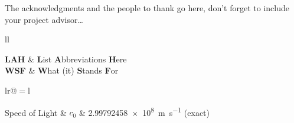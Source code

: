 \documentclass[
11pt, %
english, %
singlespacing, %
headsepline, %
]{MastersDoctoralThesis} %
\begin{document}
\begin{acknowledgements}
\addchaptertocentry{\acknowledgementname} %
The acknowledgments and the people to thank go here, don't forget to include your project advisor\ldots
\end{acknowledgements}


\tableofcontents %

\listoffigures %

\listoftables %


\begin{abbreviations}{ll} %

\textbf{LAH} & \textbf{L}ist \textbf{A}bbreviations \textbf{H}ere\\
\textbf{WSF} & \textbf{W}hat (it) \textbf{S}tands \textbf{F}or\\

\end{abbreviations}


\begin{constants}{lr@{${}={}$}l} %


Speed of Light & $c_{0}$ & \SI{2.99792458e8}{\meter\per\second} (exact)\\

\end{constants}
\end{document}
